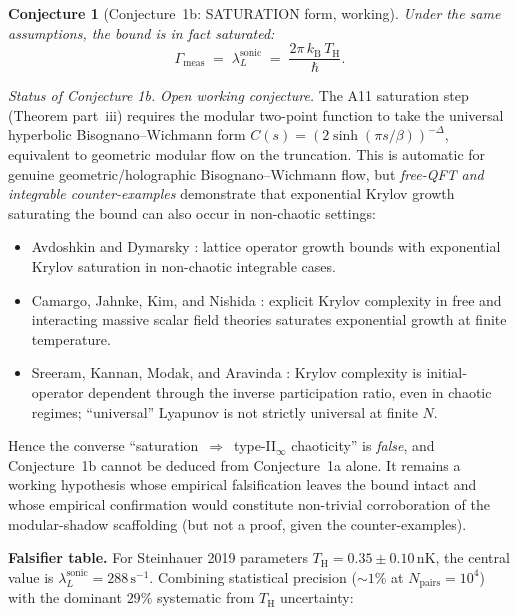 \documentclass[12pt,a4paper]{article}
\newtheorem{conjecture}{Conjecture}
\renewcommand{\TH}{T_{\mathrm{H}}}
\newcommand{\lambdaL}{\lambda_L^{\mathrm{sonic}}}
\newcommand{\kB}{k_{\mathrm{B}}}
\begin{document}
\begin{conjecture}[Conjecture~1b: SATURATION form, working]
\label{conj:1b-saturation}
Under the same assumptions, the bound is in fact \emph{saturated}:
\begin{equation}
  \boxed{\Gamma_{\mathrm{meas}} \;=\; \lambdaL
    \;=\; \frac{2\pi\,\kB\,\TH}{\hbar}.}
  \label{eq:saturation-conjecture}
\end{equation}
\end{conjecture}

\noindent\emph{Status of Conjecture 1b.}
\emph{Open working conjecture.}  The A11 saturation step
(Theorem part~iii) requires the modular two-point function to take the
universal hyperbolic Bisognano--Wichmann form
$C(s) = (2\sinh(\pi s/\beta))^{-\Delta}$, equivalent to geometric modular
flow on the truncation.  This is automatic for genuine
geometric/holographic Bisognano--Wichmann flow, but \emph{free-QFT and
integrable counter-examples} demonstrate that exponential Krylov growth
saturating the bound can also occur in non-chaotic settings:
\begin{itemize}
  \item Avdoshkin and Dymarsky \cite{avdoshkin2019}: lattice operator
    growth bounds with exponential Krylov saturation in non-chaotic
    integrable cases.
  \item Camargo, Jahnke, Kim, and Nishida \cite{camargo2022}: explicit
    Krylov complexity in free and interacting massive scalar field
    theories saturates exponential growth at finite temperature.
  \item Sreeram, Kannan, Modak, and Aravinda \cite{sreeram2025}:
    Krylov complexity is initial-operator dependent through the
    inverse participation ratio, even in chaotic regimes; ``universal''
    Lyapunov is not strictly universal at finite $N$.
\end{itemize}
Hence the converse ``saturation~$\Rightarrow$~type-II$_\infty$
chaoticity'' is \emph{false}, and Conjecture~1b cannot be deduced from
Conjecture~1a alone.  It remains a working hypothesis whose
empirical falsification leaves the bound intact and whose empirical
confirmation would constitute non-trivial corroboration of the
modular-shadow scaffolding (but not a proof, given the counter-examples).

\medskip
\noindent\textbf{Falsifier table.}  For Steinhauer 2019 parameters
$\TH = 0.35\pm 0.10\,\mathrm{nK}$, the central value is
$\lambdaL = 288\,\mathrm{s}^{-1}$.  Combining statistical precision
($\sim 1\%$ at $N_{\mathrm{pairs}} = 10^4$) with the dominant
$29\%$ systematic from $\TH$ uncertainty:
\end{document}

